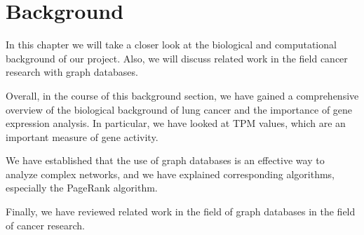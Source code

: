 \section{Background} \label{sec:background}

In this chapter we will take a closer look at the biological and computational background of our project.
Also, we will discuss related work in the field cancer research with graph databases.









Overall, in the course of this background section,
we have gained a comprehensive overview of the biological background of lung cancer and
the importance of gene expression analysis.
In particular, we have looked at TPM values, which are an important measure of gene activity.

We have established that the use of graph databases is an effective way to analyze complex networks,
and we have explained corresponding algorithms, especially the PageRank algorithm.

Finally, we have reviewed related work in the field of graph databases in the field of cancer research.
